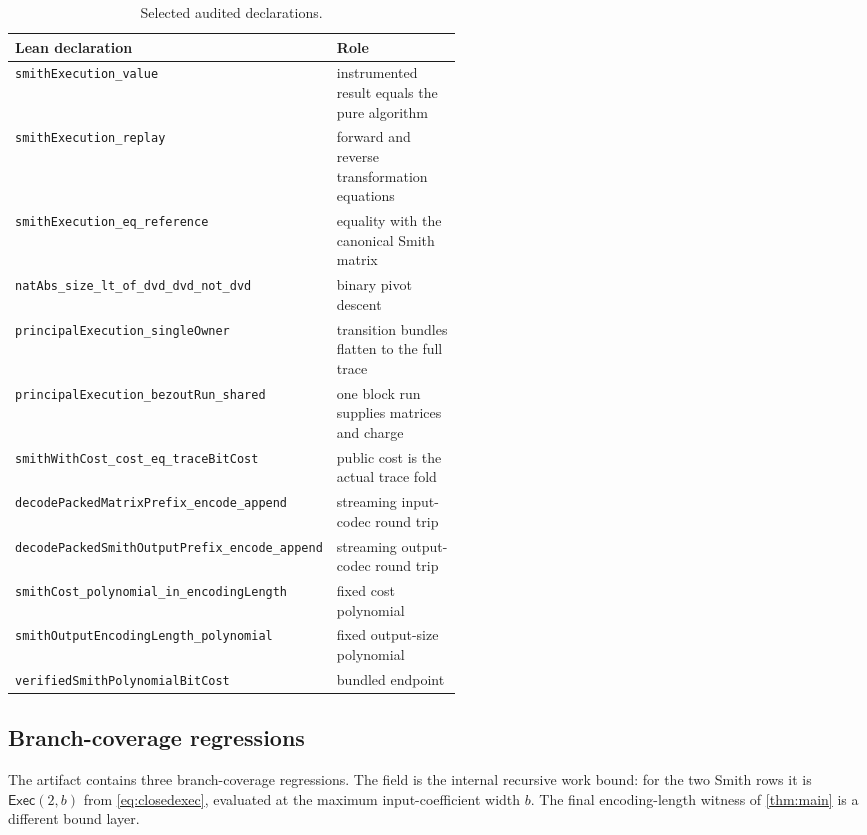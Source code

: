 \documentclass[11pt]{article}
\theoremstyle{definition}
\newcommand{\code}[1]{\texttt{\detokenize{#1}}}
\newcommand{\decl}[1]{\nolinkurl{#1}}
\begin{document}
\begin{table}[ht]
\centering
\footnotesize
\begin{tabularx}{\linewidth}{@{}p{0.52\linewidth}X@{}}
\toprule
Lean declaration & Role \\
\midrule
\decl{smithExecution_value} & instrumented result equals the pure algorithm \\
\decl{smithExecution_replay} & forward and reverse transformation equations \\
\decl{smithExecution_eq_reference} & equality with the canonical Smith matrix \\
\decl{natAbs_size_lt_of_dvd_dvd_not_dvd} & binary pivot descent \\
\decl{principalExecution_singleOwner} & transition bundles flatten to the full trace \\
\decl{principalExecution_bezoutRun_shared} & one block run supplies matrices and charge \\
\decl{smithWithCost_cost_eq_traceBitCost} & public cost is the actual trace fold \\
\decl{decodePackedMatrixPrefix_encode_append} & streaming input-codec round trip \\
\decl{decodePackedSmithOutputPrefix_encode_append} & streaming output-codec round trip \\
\decl{smithCost_polynomial_in_encodingLength} & fixed cost polynomial \\
\decl{smithOutputEncodingLength_polynomial} & fixed output-size polynomial \\
\decl{verifiedSmithPolynomialBitCost} & bundled endpoint \\
\bottomrule
\end{tabularx}
\caption{Selected audited declarations.}
\label{tab:theorems}
\end{table}

\subsection{Branch-coverage regressions}
\label{sec:observations}

The artifact contains three branch-coverage regressions.  The field \code{bit_bound} is the internal recursive work bound: for the two Smith rows it is $\mathsf{Exec}(2,b)$ from \eqref{eq:closedexec}, evaluated at the maximum input-coefficient width $b$.  The final encoding-length witness of \cref{thm:main} is a different bound layer.
\end{document}

